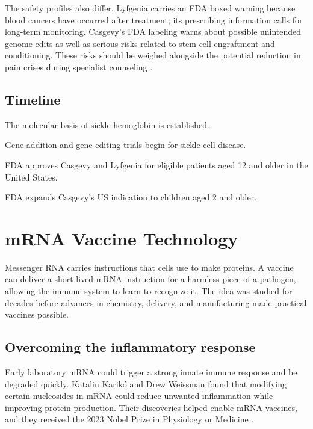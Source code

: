 \documentclass[12pt,oneside]{book}
\begin{document}
The safety profiles also differ. Lyfgenia carries an FDA boxed warning because
blood cancers have occurred after treatment; its prescribing information calls
for long-term monitoring. Casgevy's FDA labeling warns about possible unintended
genome edits as well as serious risks related to stem-cell engraftment and
conditioning. These risks should be weighed alongside the potential reduction
in pain crises during specialist counseling \cite{fdaLyfgeniaLabel,fdaCasgevyPediatric}.

\section*{Timeline}
\begin{description}[leftmargin=2.3cm,style=nextline]
  \item[1950s] The molecular basis of sickle hemoglobin is established.
  \item[2010s] Gene-addition and gene-editing trials begin for sickle-cell disease.
  \item[2023] FDA approves Casgevy and Lyfgenia for eligible patients aged 12 and older in the United States.
  \item[2026] FDA expands Casgevy's US indication to children aged 2 and older.
\end{description}
\chapter[mRNA Vaccine Technology]{mRNA Vaccine Technology}

Messenger RNA carries instructions that cells use to make proteins. A vaccine
can deliver a short-lived mRNA instruction for a harmless piece of a
pathogen, allowing the immune system to learn to recognize it. The idea was
studied for decades before advances in chemistry, delivery, and manufacturing
made practical vaccines possible.

\section{Overcoming the inflammatory response}
Early laboratory mRNA could trigger a strong innate immune response and be
degraded quickly. Katalin Karik\'o and Drew Weissman found that modifying
certain nucleosides in mRNA could reduce unwanted inflammation while
improving protein production. Their discoveries helped enable mRNA vaccines,
and they received the 2023 Nobel Prize in Physiology or Medicine
\cite{nobelMRNA}.
\end{document}
